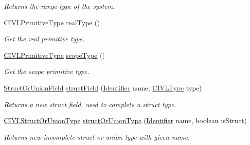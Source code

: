 \begin{DoxyCompactItemize}
\begin{DoxyCompactList}\small\item\em Returns the range type of the system. \end{DoxyCompactList}\item 
\hyperlink{interfaceedu_1_1udel_1_1cis_1_1vsl_1_1civl_1_1model_1_1IF_1_1type_1_1CIVLPrimitiveType}{C\+I\+V\+L\+Primitive\+Type} \hyperlink{interfaceedu_1_1udel_1_1cis_1_1vsl_1_1civl_1_1model_1_1IF_1_1CIVLTypeFactory_add189fcd1b9686de5451299b1404a8dd}{real\+Type} ()
\begin{DoxyCompactList}\small\item\em Get the real primitive type. \end{DoxyCompactList}\item 
\hyperlink{interfaceedu_1_1udel_1_1cis_1_1vsl_1_1civl_1_1model_1_1IF_1_1type_1_1CIVLPrimitiveType}{C\+I\+V\+L\+Primitive\+Type} \hyperlink{interfaceedu_1_1udel_1_1cis_1_1vsl_1_1civl_1_1model_1_1IF_1_1CIVLTypeFactory_a5eafb9f1c9713661c050f9455b2e0576}{scope\+Type} ()
\begin{DoxyCompactList}\small\item\em Get the scope primitive type. \end{DoxyCompactList}\item 
\hyperlink{interfaceedu_1_1udel_1_1cis_1_1vsl_1_1civl_1_1model_1_1IF_1_1type_1_1StructOrUnionField}{Struct\+Or\+Union\+Field} \hyperlink{interfaceedu_1_1udel_1_1cis_1_1vsl_1_1civl_1_1model_1_1IF_1_1CIVLTypeFactory_ae6c809d32543a625f0aa3a686231cadc}{struct\+Field} (\hyperlink{interfaceedu_1_1udel_1_1cis_1_1vsl_1_1civl_1_1model_1_1IF_1_1Identifier}{Identifier} name, \hyperlink{interfaceedu_1_1udel_1_1cis_1_1vsl_1_1civl_1_1model_1_1IF_1_1type_1_1CIVLType}{C\+I\+V\+L\+Type} type)
\begin{DoxyCompactList}\small\item\em Returns a new struct field, used to complete a struct type. \end{DoxyCompactList}\item 
\hyperlink{interfaceedu_1_1udel_1_1cis_1_1vsl_1_1civl_1_1model_1_1IF_1_1type_1_1CIVLStructOrUnionType}{C\+I\+V\+L\+Struct\+Or\+Union\+Type} \hyperlink{interfaceedu_1_1udel_1_1cis_1_1vsl_1_1civl_1_1model_1_1IF_1_1CIVLTypeFactory_af9b1d1dc0f6cc745f0b23aa73e8a27f2}{struct\+Or\+Union\+Type} (\hyperlink{interfaceedu_1_1udel_1_1cis_1_1vsl_1_1civl_1_1model_1_1IF_1_1Identifier}{Identifier} name, boolean is\+Struct)
\begin{DoxyCompactList}\small\item\em Returns new incomplete struct or union type with given name. \end{DoxyCompactList}\item 

\end{DoxyCompactItemize}
